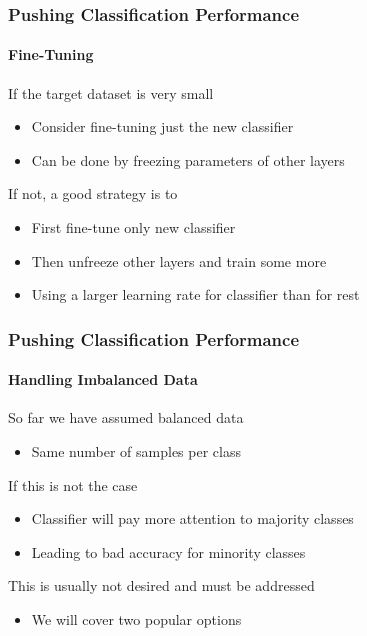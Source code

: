 \documentclass[xetex,professionalfont]{beamer}
\begin{document}
\begin{frame}
	\frametitle{Pushing Classification Performance}
	\framesubtitle{Fine-Tuning}

	If the target dataset is very small
	\begin{itemize}
		\item Consider fine-tuning just the new classifier
		\item Can be done by freezing parameters of other layers
	\end{itemize}

	\bigskip

	If not, a good strategy is to
	\begin{itemize}
		\item First fine-tune only new classifier %
		\item Then unfreeze other layers and train some more
		\item Using a larger learning rate for classifier than for rest
	\end{itemize}

\end{frame}


\begin{frame}
	\frametitle{Pushing Classification Performance}
	\framesubtitle{Handling Imbalanced Data}

	So far we have assumed balanced data
	\begin{itemize}
		\item Same number of samples per class
	\end{itemize}

	\bigskip

	If this is not the case
	\begin{itemize}
		\item Classifier will pay more attention to majority classes
		\item Leading to bad accuracy for minority classes
	\end{itemize}

	\bigskip

	This is usually not desired and must be addressed
	\begin{itemize}
		\item We will cover two popular options
	\end{itemize}
\end{frame}
\end{document}
